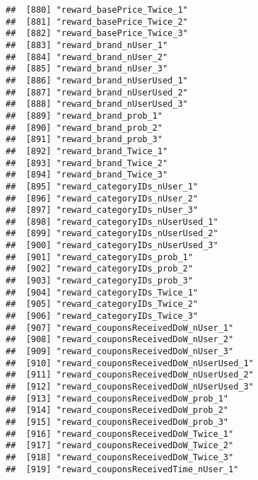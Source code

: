\documentclass[10pt]{report}
\begin{document}
\begin{verbatim}
##  [880] "reward_basePrice_Twice_1"                             
##  [881] "reward_basePrice_Twice_2"                             
##  [882] "reward_basePrice_Twice_3"                             
##  [883] "reward_brand_nUser_1"                                 
##  [884] "reward_brand_nUser_2"                                 
##  [885] "reward_brand_nUser_3"                                 
##  [886] "reward_brand_nUserUsed_1"                             
##  [887] "reward_brand_nUserUsed_2"                             
##  [888] "reward_brand_nUserUsed_3"                             
##  [889] "reward_brand_prob_1"                                  
##  [890] "reward_brand_prob_2"                                  
##  [891] "reward_brand_prob_3"                                  
##  [892] "reward_brand_Twice_1"                                 
##  [893] "reward_brand_Twice_2"                                 
##  [894] "reward_brand_Twice_3"                                 
##  [895] "reward_categoryIDs_nUser_1"                           
##  [896] "reward_categoryIDs_nUser_2"                           
##  [897] "reward_categoryIDs_nUser_3"                           
##  [898] "reward_categoryIDs_nUserUsed_1"                       
##  [899] "reward_categoryIDs_nUserUsed_2"                       
##  [900] "reward_categoryIDs_nUserUsed_3"                       
##  [901] "reward_categoryIDs_prob_1"                            
##  [902] "reward_categoryIDs_prob_2"                            
##  [903] "reward_categoryIDs_prob_3"                            
##  [904] "reward_categoryIDs_Twice_1"                           
##  [905] "reward_categoryIDs_Twice_2"                           
##  [906] "reward_categoryIDs_Twice_3"                           
##  [907] "reward_couponsReceivedDoW_nUser_1"                    
##  [908] "reward_couponsReceivedDoW_nUser_2"                    
##  [909] "reward_couponsReceivedDoW_nUser_3"                    
##  [910] "reward_couponsReceivedDoW_nUserUsed_1"                
##  [911] "reward_couponsReceivedDoW_nUserUsed_2"                
##  [912] "reward_couponsReceivedDoW_nUserUsed_3"                
##  [913] "reward_couponsReceivedDoW_prob_1"                     
##  [914] "reward_couponsReceivedDoW_prob_2"                     
##  [915] "reward_couponsReceivedDoW_prob_3"                     
##  [916] "reward_couponsReceivedDoW_Twice_1"                    
##  [917] "reward_couponsReceivedDoW_Twice_2"                    
##  [918] "reward_couponsReceivedDoW_Twice_3"                    
##  [919] "reward_couponsReceivedTime_nUser_1"                   

\end{verbatim}
\end{document}
